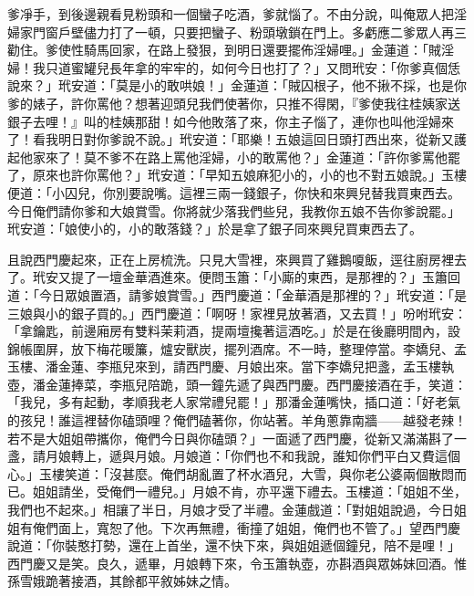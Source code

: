 爹凈手，到後邊親看見粉頭和一個蠻子吃酒，爹就惱了。不由分說，叫俺眾人把淫婦家門窗戶壁儘力打了一頓，只要把蠻子、粉頭墩鎖在門上。多虧應二爹眾人再三勸住。爹使性騎馬回家，在路上發狠，到明日還要擺佈淫婦哩。」金蓮道：「賊淫婦！我只道蜜罐兒長年拿的牢牢的，如何今日也打了？」又問玳安：「你爹真個恁說來？」玳安道：「莫是小的敢哄娘！」金蓮道：「賊囚根子，他不揪不採，也是你爹的婊子，許你罵他？想著迎頭兒我們使著你，只推不得閑，『爹使我往桂姨家送銀子去哩！』叫的桂姨那甜！如今他敗落了來，你主子惱了，連你也叫他淫婦來了！看我明日對你爹說不說。」玳安道：「耶樂！五娘這回日頭打西出來，從新又護起他家來了！莫不爹不在路上罵他淫婦，小的敢罵他？」金蓮道：「許你爹罵他罷了，原來也許你罵他？」玳安道：「早知五娘麻犯小的，小的也不對五娘說。」玉樓便道：「小囚兒，你別要說嘴。這裡三兩一錢銀子，你快和來興兒替我買東西去。今日俺們請你爹和大娘賞雪。你將就少落我們些兒，我教你五娘不告你爹說罷。」玳安道：「娘使小的，小的敢落錢？」於是拿了銀子同來興兒買東西去了。

且說西門慶起來，正在上房梳洗。只見大雪裡，來興買了雞鵝嗄飯，逕往廚房裡去了。玳安又提了一壇金華酒進來。便問玉簫：「小廝的東西，是那裡的？」玉簫回道：「今日眾娘置酒，請爹娘賞雪。」西門慶道：「金華酒是那裡的？」玳安道：「是三娘與小的銀子買的。」西門慶道：「啊呀！家裡見放著酒，又去買！」吩咐玳安：「拿鑰匙，前邊廂房有雙料茉莉酒，提兩壇攙著這酒吃。」於是在後廳明間內，設錦帳圍屏，放下梅花暖簾，爐安獸炭，擺列酒席。不一時，整理停當。李嬌兒、孟玉樓、潘金蓮、李瓶兒來到，請西門慶、月娘出來。當下李嬌兒把盞，孟玉樓執壺，潘金蓮捧菜，李瓶兒陪跪，頭一鐘先遞了與西門慶。西門慶接酒在手，笑道：「我兒，多有起動，孝順我老人家常禮兒罷！」那潘金蓮嘴快，插口道：「好老氣的孩兒！誰這裡替你磕頭哩？俺們磕著你，你站著。羊角蔥靠南牆——越發老辣！若不是大姐姐帶攜你，俺們今日與你磕頭？」一面遞了西門慶，從新又滿滿斟了一盞，請月娘轉上，遞與月娘。月娘道：「你們也不和我說，誰知你們平白又費這個心。」玉樓笑道：「沒甚麼。俺們胡亂置了杯水酒兒，大雪，與你老公婆兩個散悶而已。姐姐請坐，受俺們一禮兒。」月娘不肯，亦平還下禮去。玉樓道：「姐姐不坐，我們也不起來。」相讓了半日，月娘才受了半禮。金蓮戲道：「對姐姐說過，今日姐姐有俺們面上，寬恕了他。下次再無禮，衝撞了姐姐，俺們也不管了。」望西門慶說道：「你裝憨打勢，還在上首坐，還不快下來，與姐姐遞個鐘兒，陪不是哩！」西門慶又是笑。良久，遞畢，月娘轉下來，令玉簫執壺，亦斟酒與眾姊妹回酒。惟孫雪娥跪著接酒，其餘都平敘姊妹之情。

